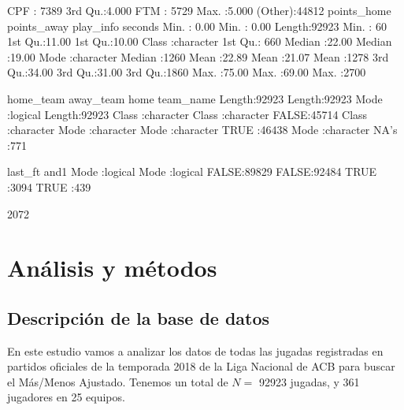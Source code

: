 \documentclass[paper=a4, fontsize=9pt]{article}
\begin{document}
\begin{Schunk}
\begin{Soutput}
                    CPF    : 7389                     3rd Qu.:4.000  
                    FTM    : 5729                     Max.   :5.000  
                    (Other):44812                                    
  points_home     points_away     play_info            seconds    
 Min.   : 0.00   Min.   : 0.00   Length:92923       Min.   :  60  
 1st Qu.:11.00   1st Qu.:10.00   Class :character   1st Qu.: 660  
 Median :22.00   Median :19.00   Mode  :character   Median :1260  
 Mean   :22.89   Mean   :21.07                      Mean   :1278  
 3rd Qu.:34.00   3rd Qu.:31.00                      3rd Qu.:1860  
 Max.   :75.00   Max.   :69.00                      Max.   :2700  
                                                                  
  home_team          away_team            home          team_name        
 Length:92923       Length:92923       Mode :logical   Length:92923      
 Class :character   Class :character   FALSE:45714     Class :character  
 Mode  :character   Mode  :character   TRUE :46438     Mode  :character  
                                       NA's :771                         
                                                                         
                                                                         
                                                                         
  last_ft           and1        
 Mode :logical   Mode :logical  
 FALSE:89829     FALSE:92484    
 TRUE :3094      TRUE :439      
\end{Soutput}
\begin{Soutput}
[1] 2072
\end{Soutput}
\end{Schunk}


\section{Análisis y métodos}

\subsection{Descripción de la base de datos}

En este estudio vamos a analizar los datos de todas las jugadas registradas en partidos oficiales de la temporada 2018 de la Liga Nacional de ACB para buscar el Más/Menos Ajustado. Tenemos un total de $N=$ 92923 jugadas, y 361 jugadores en 25 equipos.
\end{document}
